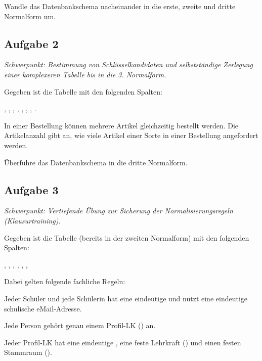 Wandle das Datenbankschema nacheinander in die erste, zweite und dritte
Normalform um.


\subsection{Aufgabe 2 \tagZusatz \tagLK}
\noindent \emph{Schwerpunkt: Bestimmung von Schlüsselkandidaten und selbstständige Zerlegung einer komplexeren Tabelle bis in die 3. Normalform.}

Gegeben ist die Tabelle  mit den folgenden Spalten:

, ,
, ,
, ,
, .

In einer Bestellung können mehrere Artikel gleichzeitig bestellt werden. Die
Artikelanzahl gibt an, wie viele Artikel einer Sorte in einer Bestellung
angefordert werden.

Überführe das Datenbankschema in die dritte Normalform.


\subsection{Aufgabe 3 \tagZusatz \tagLK}
\noindent \emph{Schwerpunkt: Vertiefende Übung zur Sicherung der Normalisierungsregeln (Klausurtraining).}

Gegeben ist die Tabelle  (bereits in der zweiten 
Normalform) mit den folgenden Spalten: 

, , , 
, , , 

Dabei gelten folgende fachliche Regeln:

\begin{compactitem}
\item Jeder Schüler und jede Schülerin hat eine eindeutige 
 und nutzt eine eindeutige schulische eMail-Adresse.
\item Jede Person gehört genau einem Profil-LK () 
an.
\item Jeder Profil-LK hat eine eindeutige , eine 
feste Lehrkraft () und einen festen Stammraum 
().
\end{compactitem}

